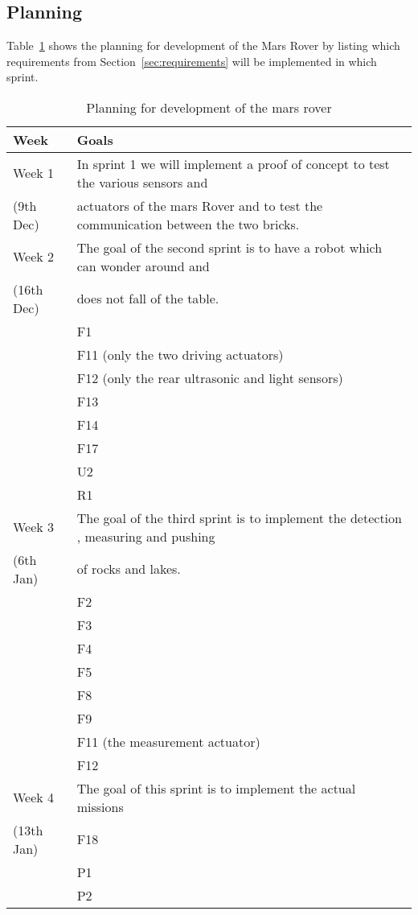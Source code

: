 \subsection{Planning}
Table~\ref{tbl:planning} shows the planning for development of the Mars Rover by
listing which requirements from Section~\ref{sec:requirements} will be
implemented in which sprint.
\begin{table}[H]
	\centering
	\begin{tabular}{|l|l|}
		\hline
		Week 	& Goals \\  \hline
		\hline
		Week 1 		& In sprint 1 we will implement a proof of concept to test
						the various sensors and\\   
		(9th Dec)	&	actuators of the mars Rover
						and to test the communication between the two bricks.\\   
		\hline
		Week 2  	& 	The goal of the second sprint is to have a robot which 
						can wonder around and \\  
		(16th Dec)	&	does not fall of the table.\\  
					&	\tabitem F1\\  
					&	\tabitem F11 (only the two driving actuators)\\  
					&	\tabitem F12 (only the rear ultrasonic 
										and light sensors)\\  
					&	\tabitem F13 \\  
					&	\tabitem F14\\  
					&	\tabitem F17\\  
					&	\tabitem U2\\  
					&	\tabitem R1\\  
		\hline
		Week 3		& The goal of the third sprint is to implement the detection
						, measuring and pushing \\  
		(6th Jan)	& of rocks and lakes. \\  
					& 	\tabitem F2\\  
					& 	\tabitem F3\\  
					& 	\tabitem F4\\  
					& 	\tabitem F5\\  
					& 	\tabitem F8\\  
					&  	\tabitem F9\\  
					& 	\tabitem F11 (the measurement actuator)\\  
					& 	\tabitem F12\\  
		\hline
		Week 4 		& The goal of this sprint is to implement the actual 
						missions\\  
		(13th Jan) 	& 	\tabitem F18\\  
					& 	\tabitem P1\\  
					&	\tabitem P2\\  
		\hline
	\end{tabular}
\caption{Planning for development of the mars rover}
\label{tbl:planning}
\end{table}